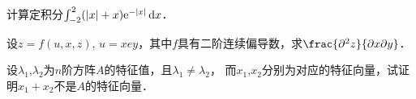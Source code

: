 \documentclass[plain,noanswer,medmath]{../../template/jnuexam}
\begin{document}














\begin{problem}[points=6]
计算定积分$\int_{-2}^2 (|x|+x)\mathrm{e}^{-|x|} \mathop{}\!\mathrm{d} x$．
\end{problem}





\begin{problem}
设$z = f(u,x,z)$, $u = xey$，其中$f$具有二阶连续偏导数，求$\frac{\pd^2 z}{\pdx\pd y}$．
\end{problem}




























\begin{problem}
设$\lambda_1$,$\lambda_2$为$n$阶方阵$A$的特征值，且$\lambda_1 \ne \lambda_2$，
而$x_1$,$x_2$分别为对应的特征向量，试证明$x_1 + x_2$不是$A$的特征向量．
\end{problem}
\end{document}
